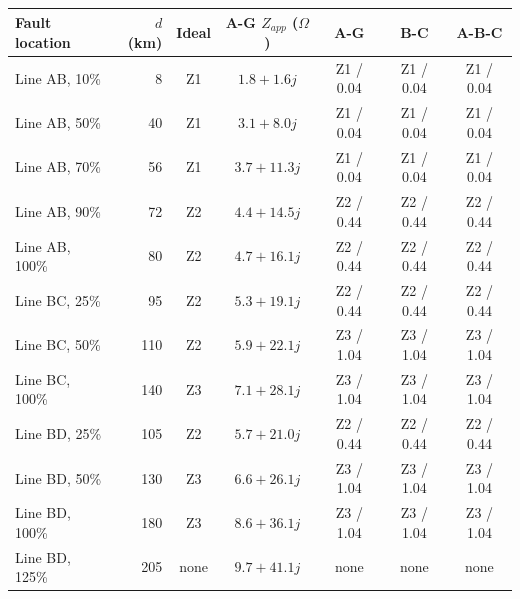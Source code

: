 \footnotesize\begin{tabular}{lrccccc}\toprule
Fault location & $d$ (km) & Ideal & A-G $Z_{app}$ ($\Omega$) & A-G & B-C & A-B-C\\\midrule
Line AB, 10\% & 8 & Z1 & $1.8+1.6j$ & Z1 / 0.04 & Z1 / 0.04 & Z1 / 0.04\\
Line AB, 50\% & 40 & Z1 & $3.1+8.0j$ & Z1 / 0.04 & Z1 / 0.04 & Z1 / 0.04\\
Line AB, 70\% & 56 & Z1 & $3.7+11.3j$ & Z1 / 0.04 & Z1 / 0.04 & Z1 / 0.04\\
Line AB, 90\% & 72 & Z2 & $4.4+14.5j$ & Z2 / 0.44 & Z2 / 0.44 & Z2 / 0.44\\
Line AB, 100\% & 80 & Z2 & $4.7+16.1j$ & Z2 / 0.44 & Z2 / 0.44 & Z2 / 0.44\\
Line BC, 25\% & 95 & Z2 & $5.3+19.1j$ & Z2 / 0.44 & Z2 / 0.44 & Z2 / 0.44\\
Line BC, 50\% & 110 & Z2 & $5.9+22.1j$ & Z3 / 1.04 & Z3 / 1.04 & Z3 / 1.04\\
Line BC, 100\% & 140 & Z3 & $7.1+28.1j$ & Z3 / 1.04 & Z3 / 1.04 & Z3 / 1.04\\
Line BD, 25\% & 105 & Z2 & $5.7+21.0j$ & Z2 / 0.44 & Z2 / 0.44 & Z2 / 0.44\\
Line BD, 50\% & 130 & Z3 & $6.6+26.1j$ & Z3 / 1.04 & Z3 / 1.04 & Z3 / 1.04\\
Line BD, 100\% & 180 & Z3 & $8.6+36.1j$ & Z3 / 1.04 & Z3 / 1.04 & Z3 / 1.04\\
Line BD, 125\% & 205 & none & $9.7+41.1j$ & none & none & none\\
\bottomrule\end{tabular}
